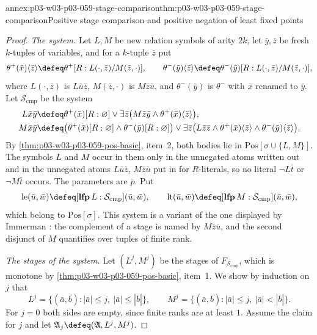 \begin{annexitem}{annex:p03-w03-p03-059-stage-comparison}{thm:p03-w03-p03-059-stage-comparison}{Positive stage comparison and positive negation of least fixed points}
\begin{proof}
\emph{The system.} Let \(L,M\) be new relation symbols of arity \(2k\),
let \(\bar y,\bar z\) be fresh \(k\)-tuples of variables, and for a
\(k\)-tuple \(\bar z\) put
\[
 \theta^+(\bar x)\langle\bar z\rangle\defeq
 \theta^+[R:L(\cdot,\bar z)/M(\bar z,\cdot)],\qquad
 \theta^-(\bar y)\langle\bar z\rangle\defeq
 \theta^-(\bar y)[R:L(\cdot,\bar z)/M(\bar z,\cdot)],
\]
where \(L(\cdot,\bar z)\) is \(L\bar u\bar z\), \(M(\bar z,\cdot)\) is
\(M\bar z\bar u\), and \(\theta^-(\bar y)\) is \(\theta^-\) with \(\bar x\)
renamed to \(\bar y\). Let \(\mathcal S_{\mathrm{cmp}}\) be the system
\[
\begin{aligned}
 L\bar x\bar y&\defeq\theta^+(\bar x)[R:\varnothing]\lor
   \exists\bar z\bigl(M\bar z\bar y\land\theta^+(\bar x)\langle\bar z\rangle\bigr),\\
 M\bar x\bar y&\defeq\bigl(\theta^+(\bar x)[R:\varnothing]\land
   \theta^-(\bar y)[R:\varnothing]\bigr)\lor
   \exists\bar z\bigl(L\bar z\bar z\land\theta^+(\bar x)\langle\bar z\rangle
   \land\theta^-(\bar y)\langle\bar z\rangle\bigr).
\end{aligned}
\]
By \cref{thm:p03-w03-p03-059-pos-basic}, item~2, both bodies lie in
\(\mathrm{Pos}[\sigma\cup\{L,M\}]\). The symbols \(L\) and \(M\) occur in
them only in the unnegated atoms written out and in the unnegated atoms
\(L\bar u\bar z\), \(M\bar z\bar u\) put in for \(R\)-literals, so no
literal \(\neg L\bar t\) or \(\neg M\bar t\) occurs. The parameters are
\(\bar p\). Put
\[
 \mathrm{le}(\bar u,\bar w)\defeq[\mathbf{lfp}\,L:\mathcal S_{\mathrm{cmp}}](\bar u,\bar w),
 \qquad
 \mathrm{lt}(\bar u,\bar w)\defeq[\mathbf{lfp}\,M:\mathcal S_{\mathrm{cmp}}](\bar u,\bar w),
\]
which belong to \(\mathrm{Pos}[\sigma]\). This system is a variant of the
one displayed by Immerman \cite[p.~98]{Immerman1986}: the complement of a
stage is named by \(M\bar z\bar u\), and the second disjunct of \(M\)
quantifies over tuples of finite rank.

\emph{The stages of the system.} Let \((L^j,M^j)\) be the stages of
\(F_{\mathcal S_{\mathrm{cmp}}}\), which is monotone by
\cref{thm:p03-w03-p03-059-pos-basic}, item~1. We show by induction on
\(j\) that
\[
 L^j=\{(\bar a,\bar b):|\bar a|\leq j,\ |\bar a|\leq|\bar b|\},\qquad
 M^j=\{(\bar a,\bar b):|\bar a|\leq j,\ |\bar a|<|\bar b|\}.
\]
For \(j=0\) both sides are empty, since finite ranks are at least \(1\).
Assume the claim for \(j\) and let \(\mathfrak A_j\defeq(\mathfrak
A,L^j,M^j)\).


\end{proof}
\end{annexitem}
